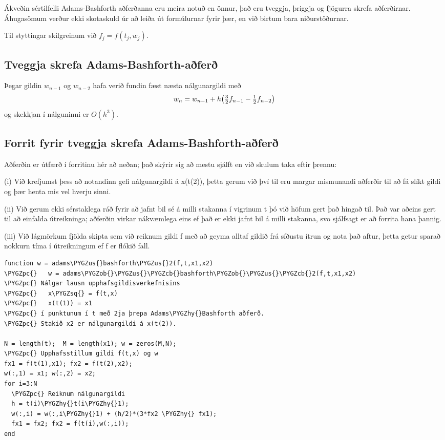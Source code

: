 \documentclass[letterpaper,10pt,icelandic]{sphinxmanual}
\def\PYGZus{\char`\_}
\def\PYGZob{\char`\{}
\def\PYGZcb{\char`\}}
\def\PYGZpc{\char`\%}
\def\PYGZhy{\char`\-}
\def\PYGZsq{\char`\'}
\renewcommand\PYGZsq{\textquotesingle}
\begin{document}
Ákveðin sértilfelli Adams-Bashforth aðferðanna eru meira notuð en önnur,
það eru tveggja, þriggja og fjögurra skrefa aðferðirnar. Áhugasömum
verður ekki skotaskuld úr að leiða út formúlurnar fyrir þær, en við
birtum bara niðurstöðurnar.

Til styttingar skilgreinum við \(f_j = f(t_j,w_j)\).


\subsection{Tveggja skrefa Adams-Bashforth-aðferð}
\label{kafli06:tveggja-skrefa-adams-bashforth-afer}
Þegar gildin \(w_{n-1}\) og \(w_{n-2}\) hafa verið fundin fæst
næsta nálgunargildi með
\begin{gather}
\begin{split}w_{n} = w_{n-1} + h\big(\tfrac 32 f_{n-1} - \tfrac 12 f_{n-2}\big)\end{split}\notag
\end{gather}
og skekkjan í nálguninni er \(O(h^3)\).


\subsection{Forrit fyrir tveggja skrefa Adams-Bashforth-aðferð}
\label{kafli06:forrit-fyrir-tveggja-skrefa-adams-bashforth-afer}
Aðferðin er útfærð í forritinu hér að neðan; það skýrir sig að mestu
sjálft en við skulum taka eftir þrennu:

(i) Við krefjumst þess að notandinn gefi nálgunargildi á x(t(2)), þetta
gerum við því til eru margar mismunandi aðferðir til að fá slíkt gildi
og þær henta mis vel hverju sinni.

(ii) Við gerum ekki sérstaklega ráð fyrir að jafnt bil sé á milli
stakanna í vigrinum t þó við höfum gert það hingað til. Það var aðeins
gert til að einfalda útreikninga; aðferðin virkar nákvæmlega eins ef það
er ekki jafnt bil á milli stakanna, svo sjálfsagt er að forrita hana
þannig.

(iii) Við lágmörkum fjölda skipta sem við reiknum gildi f með að geyma
alltaf gildið frá síðustu ítrun og nota það aftur, þetta getur sparað
nokkurn tíma í útreikningum ef f er flókið fall.

\begin{Verbatim}[commandchars=\\\{\}]
function w = adams\PYGZus{}bashforth\PYGZus{}2(f,t,x1,x2)
\PYGZpc{}   w = adams\PYGZob{}\PYGZus{}\PYGZcb{}bashforth\PYGZob{}\PYGZus{}\PYGZcb{}2(f,t,x1,x2)
\PYGZpc{} Nálgar lausn upphafsgildisverkefnisins
\PYGZpc{}   x\PYGZsq{} = f(t,x)
\PYGZpc{}   x(t(1)) = x1
\PYGZpc{} í punktunum í t með 2ja þrepa Adams\PYGZhy{}Bashforth aðferð.
\PYGZpc{} Stakið x2 er nálgunargildi á x(t(2)).

N = length(t);  M = length(x1); w = zeros(M,N);
\PYGZpc{} Upphafsstillum gildi f(t,x) og w
fx1 = f(t(1),x1); fx2 = f(t(2),x2);
w(:,1) = x1; w(:,2) = x2;
for i=3:N
  \PYGZpc{} Reiknum nálgunargildi
  h = t(i)\PYGZhy{}t(i\PYGZhy{}1);
  w(:,i) = w(:,i\PYGZhy{}1) + (h/2)*(3*fx2 \PYGZhy{} fx1);
  fx1 = fx2; fx2 = f(t(i),w(:,i));
end
\end{Verbatim}
\end{document}
